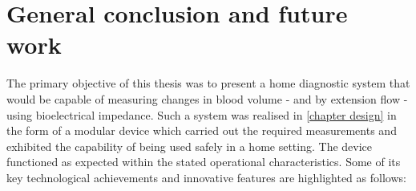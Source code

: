 
\chapter{General conclusion and future work}  %

\ifpdf
    \graphicspath{{Chapter10/Figs/Raster/}{Chapter10/Figs/PDF/}{Chapter10/Figs/}}
\else
    \graphicspath{{Chapter10/Figs/Vector/}{Chapter10/Figs/}}
\fi

The primary objective of this thesis was to present a home diagnostic system that would be capable of measuring changes in blood volume - and by extension flow - using bioelectrical impedance. Such a system was realised in \ref{chapter design} in the form of a modular device which carried out the required measurements and exhibited the capability of being used safely in a home setting. The device functioned as expected within the stated operational characteristics. Some of its key technological achievements and innovative features are highlighted as follows: 

